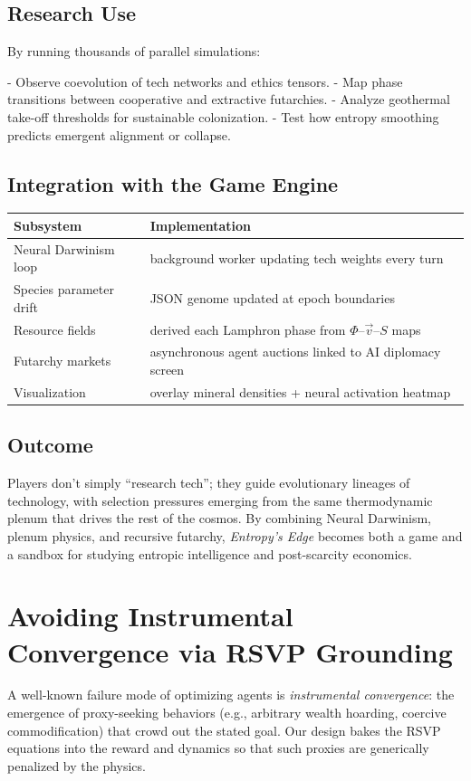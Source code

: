 \documentclass[12pt]{article}
\theoremstyle{definition}
\begin{document}
\subsection{Research Use}
By running thousands of parallel simulations:

- Observe coevolution of tech networks and ethics tensors.
- Map phase transitions between cooperative and extractive futarchies.
- Analyze geothermal take-off thresholds for sustainable colonization.
- Test how entropy smoothing predicts emergent alignment or collapse.

\subsection{Integration with the Game Engine}
\begin{tabular}{ll}
\toprule
Subsystem & Implementation \\
\midrule
Neural Darwinism loop & background worker updating tech weights every turn \\
Species parameter drift & JSON genome updated at epoch boundaries \\
Resource fields & derived each Lamphron phase from $\Phi$–$\vec{v}$–$S$ maps \\
Futarchy markets & asynchronous agent auctions linked to AI diplomacy screen \\
Visualization & overlay mineral densities + neural activation heatmap \\
\bottomrule
\end{tabular}

\subsection{Outcome}
Players don’t simply “research tech”; they guide evolutionary lineages of technology, with selection pressures emerging from the same thermodynamic plenum that drives the rest of the cosmos. By combining Neural Darwinism, plenum physics, and recursive futarchy, \emph{Entropy’s Edge} becomes both a game and a sandbox for studying entropic intelligence and post-scarcity economics.

\section{Avoiding Instrumental Convergence via RSVP Grounding}
\label{sec:anti-instrumental}

A well-known failure mode of optimizing agents is \emph{instrumental convergence}: the emergence of proxy-seeking behaviors
(e.g., arbitrary wealth hoarding, coercive commodification) that crowd out the stated goal. Our design bakes the RSVP
equations into the reward and dynamics so that such proxies are generically penalized by the physics.
\end{document}

